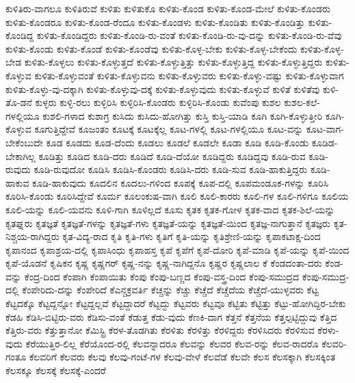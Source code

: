 {ಕುಳಿತಿರು-ವಾಗಲೂ
ಕುಳಿತಿರುವೆ
ಕುಳಿತು
ಕುಳಿತುಕೊ
ಕುಳಿತು-ಕೊಂಡ
ಕುಳಿತು-ಕೊಂಡ-ಮೇಲೆ
ಕುಳಿತು-ಕೊಂಡರು
ಕುಳಿತು-ಕೊಂಡರೂ
ಕುಳಿತು-ಕೊಂಡ-ರೆಂದೂ
ಕುಳಿತು-ಕೊಂಡಳು
ಕುಳಿತು-ಕೊಂಡಿತು
ಕುಳಿತು-ಕೊಂಡಿತ್ತು
ಕುಳಿತು-ಕೊಂಡಿದ್ದ
ಕುಳಿತು-ಕೊಂಡಿದ್ದರು
ಕುಳಿತು-ಕೊಂಡಿ-ರು-ವಂತೆ
ಕುಳಿತು-ಕೊಂಡಿ-ರು-ವು-ದನ್ನು
ಕುಳಿತು-ಕೊಂಡಿ-ರು-ವೆವು
ಕುಳಿತು-ಕೊಂಡು
ಕುಳಿತು-ಕೊಂಡೆ
ಕುಳಿತು-ಕೊಂಡೆವು
ಕುಳಿತು-ಕೊಳ್ಳ-ಬೇಕು
ಕುಳಿತು-ಕೊಳ್ಳ-ಬೇಕೆಂದು
ಕುಳಿತು-ಕೊಳ್ಳ-ಬೇಡ
ಕುಳಿತು-ಕೊಳ್ಳಲು
ಕುಳಿತು-ಕೊಳ್ಳುತ್ತದೆ
ಕುಳಿತು-ಕೊಳ್ಳುತ್ತಿತ್ತು
ಕುಳಿತು-ಕೊಳ್ಳುತ್ತಿದ್ದ
ಕುಳಿತು-ಕೊಳ್ಳುತ್ತಿದ್ದರು
ಕುಳಿತು-ಕೊಳ್ಳುವ
ಕುಳಿತು-ಕೊಳ್ಳುವಂತೆ
ಕುಳಿತು-ಕೊಳ್ಳುವನು
ಕುಳಿತು-ಕೊಳ್ಳುವರು
ಕುಳಿತು-ಕೊಳ್ಳು-ವಷ್ಟು
ಕುಳಿತು-ಕೊಳ್ಳುವಾಗ
ಕುಳಿತು-ಕೊಳ್ಳು-ವು-ದಕ್ಕಾಗಿ
ಕುಳಿತು-ಕೊಳ್ಳುವು-ದಕ್ಕೆ
ಕುಳಿತು-ಕೊಳ್ಳುವುದು
ಕುಳಿತು-ಕೊಳ್ಳುವೆ
ಕುಳಿತೆ
ಕುಳಿತೆವು
ಕುಳಿ-ತೊ-ಡನೆ
ಕುಳ್ಳರು
ಕುಳ್ಳಿ-ರಲು
ಕುಳ್ಳಿರಿಸಿ
ಕುಳ್ಳಿರಿಸಿ-ಕೊಂಡರು
ಕುಳ್ಳಿರಿಸಿ-ಕೊಂಡು
ಕುವೆಂಪು
ಕುಶಲ
ಕುಶಲ-ಕಲೆ-ಗಳಲ್ಲಿಯೂ
ಕುಶಲಿ-ಗಳಾದ
ಕುಶಾಗ್ರ
ಕುಸಿದು
ಕುಸಿದು-ಹೋಗಿತ್ತು
ಕುಸ್ತಿ
ಕುಸ್ತಿ-ಯಾಡಿ
ಕೂಗಿ
ಕೂಗಿ-ಕೊಳ್ಳುತ್ತೀರಿ
ಕೂಗಿ-ಕೊಳ್ಳುವ
ಕೂಗುತ್ತಿದ್ದೇವೆ
ಕೂಜಂತಂ
ಕೂಟಕ್ಕೆ
ಕೂಟಕ್ಕೆಲ್ಲ
ಕೂಟ-ಗಳಲ್ಲಿ
ಕೂಟ-ಗಳಲ್ಲಿಯೂ
ಕೂಟ-ವನ್ನು
ಕೂಟ-ವಾಗ-ಬೇಕೆಂಬುದೇ
ಕೂಡ
ಕೂಡದು
ಕೂಡ-ದೆಂದು
ಕೂಡಲು
ಕೂಡಲೆ
ಕೂಡಲೇ
ಕೂಡಾ
ಕೂಡಿ
ಕೂಡಿ-ಕೊಂಡು
ಕೂಡಿಡ-ಬೇಕಾಗಿಲ್ಲ
ಕೂಡಿತ್ತು
ಕೂಡಿದ
ಕೂಡಿ-ದರು
ಕೂಡಿದೆ
ಕೂಡಿ-ದೆಯೋ
ಕೂಡಿದ್ದರು
ಕೂಡಿದ್ದವು
ಕೂಡಿ-ರುವ
ಕೂಡಿ-ರುವುದು
ಕೂಡಿ-ರುವುದೋ
ಕೂಡಿಸಿ
ಕೂಡಿಸಿ-ಕೊಂಡರು
ಕೂಡಿಸಿ-ದರು
ಕೂಡಿ-ಸುವ
ಕೂಡಿ-ಹಾಕುತ್ತಿದ್ದರು
ಕೂಡಿ-ಹಾಕುವ
ಕೂಡಿ-ಹಾಕುವುದು
ಕೂದಲಿನ
ಕೂದಲು-ಗಳಿಂದ
ಕೂಪಕ್ಕೆ
ಕೂಪ-ದಲ್ಲಿ
ಕೂಪಮಂಡೂಕ-ಗಳನ್ನು
ಕೂರಿಸಿ
ಕೂರಿಸಿ-ಕೊಂಡು
ಕೂರಿಸಿದ್ದೇವೆ
ಕೂರ್ಮ
ಕೂಲಂಕುಷ-ವಾಗಿ
ಕೂಲಿ
ಕೂಲಿ-ಕಾರರು
ಕೂಲಿ-ಗಳ
ಕೂಲಿ-ಗಳಿಗೂ
ಕೂಲಿಯ
ಕೂಲಿ-ಯನ್ನು
ಕೂಲಿ-ಯವನು
ಕೂಳಿ-ಗಾಗಿ
ಕೂಳಿಲ್ಲದೆ
ಕೂಸು
ಕೃತಕ
ಕೃತಕ-ಗೋಳ
ಕೃತಕ-ವಾದ
ಕೃತಕ-ಶಿಲೆ-ಯನ್ನು
ಕೃತಘ್ನರು
ಕೃತಜ್ಞತೆ
ಕೃತಜ್ಞತೆ-ಗಳನ್ನು
ಕೃತಜ್ಞತೆ-ಗಳು
ಕೃತಜ್ಞತೆ-ಯನ್ನು
ಕೃತಜ್ಞತೆ-ಯಿಂದ
ಕೃತಜ್ಞ-ನಾಗುತ್ತಾನೆ
ಕೃತಜ್ಞರು
ಕೃತ-ನಿಶ್ಚಯ-ರಾಗಿದ್ದರು
ಕೃತ-ವಿದ್ಯ-ರಾದ
ಕೃತಿ
ಕೃತಿ-ಗಳು
ಕೃತಿಗೆ
ಕೃತಿ-ಯನ್ನು
ಕೃತಿಶ್ರೇಣಿ-ಯನ್ನು
ಕೃಪಾಕಟಾಕ್ಷ-ದಿಂದ
ಕೃಪಾನಂದ
ಕೃಪಾಶ್ರಯ-ದಲ್ಲಿ
ಕೃಪಾಸಿಂಧು
ಕೃಪಾಹಸ್ತ
ಕೃಪೆ
ಕೃಪೆಗೆ
ಕೃಪೆ-ದೋರಿ
ಕೃಪೆ-ಮಾಡಿ
ಕೃಪೆ-ಯನ್ನು
ಕೃಪೆ-ಯಿಂದ
ಕೃಪೆ-ಯೊಡನೆ
ಕೃಷಿಕನ
ಕೃಷ್ಣ
ಕೃಷ್ಣಗರ್
ಕೃಷ್ಣ-ನನ್ನು
ಕೃಷ್ಣ-ನಾಗಿದ್ದನೊ
ಕೃಷ್ಣರ
ಕೃಷ್ಣಲಾಲ
ಕೆ
ಕೆಂಡದಂತಾ-ದರು
ಕೆಂಡ-ವನ್ನು
ಕೆಂದ್ರ-ದಿಂದ
ಕೆಂಪಾಗಿ
ಕೆಂಪಾಯಿತು
ಕೆಂಪು
ಕೆಂಪು-ಬಣ್ಣದ
ಕೆಂಪು-ವಸ್ತ್ರ-ದಿಂದ
ಕೆಂಪು-ಸಮುದ್ರದ
ಕೆಂಪು-ಸಮುದ್ರ-ದಲ್ಲಿ
ಕೆಂಪೇರಿದು-ದನ್ನು
ಕೆಂಪೇರಿದೆ
ಕೆಎನ್ಚಕ್ರವರ್ತಿ
ಕೆಚ್ಚನ್ನು
ಕೆಚ್ಚು
ಕೆಚ್ಚೆದೆ
ಕೆಚ್ಚೆದೆಯ
ಕೆಚ್ಚೆದೆ-ಯುಳ್ಳವರು
ಕೆಟ್ಟ
ಕೆಟ್ಟದಕ್ಕೊ
ಕೆಟ್ಟದ್ದನ್ನೋ
ಕೆಟ್ಟದ್ದಲ್ಲವೆ
ಕೆಟ್ಟದ್ದಾದರೆ
ಕೆಟ್ಟದ್ದು
ಕೆಟ್ಟವರು
ಕೆಟ್ಟವೂ
ಕೆಟ್ಟಿತು
ಕೆಟ್ಟಿತ್ತು
ಕೆಟ್ಟು-ಹೋಗಿದ್ದಿರ-ಬೇಕು
ಕೆಡಹಿ
ಕೆಡಿಸಿ-ಬಿಟ್ಟಿರು-ವರು
ಕೆಡಿಸು-ವಂತೆ
ಕೆಡುತ್ತ
ಕೆಡು-ವುದು
ಕೆಣಕಿ-ದಾಗ
ಕೆತ್ತನೆ
ಕೆತ್ತನೆಯ
ಕೆತ್ತಲ್ಪಟ್ಟಿದ್ದುವು
ಕೆತ್ತಿದ
ಕೆತ್ತಿರು-ವರು
ಕೆತ್ತುತ್ತಾನೋ
ಕೆಮಿಸ್ಟ್ರಿ
ಕೆರಳ-ತೊಡಗಿತು
ಕೆರಳಿತು
ಕೆರಳಿತ್ತು
ಕೆರಳಿದ್ದರು
ಕೆರಳಿಸಿದರು
ಕೆರಳಿಸುವ
ಕೆರಳು-ವುದು
ಕೆರೆಯುತ್ತಿರ-ಲಿಲ್ಲ
ಕೆರೆಯೊಂದ-ರಲ್ಲಿ
ಕೆಲವನ್ನಾದರೂ
ಕೆಲವನ್ನು
ಕೆಲವರ
ಕೆಲವ-ರನ್ನು
ಕೆಲವ-ರಾದರೊ
ಕೆಲವರಿ-ಗಂತೂ
ಕೆಲವರಿಗೆ
ಕೆಲವರು
ಕೆಲವು
ಕೆಲವು-ಗಂಟೆ-ಗಳ
ಕೆಲವು-ವೇಳೆ
ಕೆಲವೆಡೆ
ಕೆಲವೇ
ಕೆಲಸ
ಕೆಲಸಕ್ಕಾಗಿ
ಕೆಲಸಕ್ಕಿಂತ
ಕೆಲಸಕ್ಕೂ
ಕೆಲಸಕ್ಕೆ
ಕೆಲಸಕ್ಕೆ-ಎಂದರೆ
}
